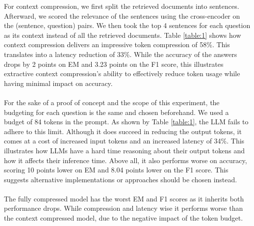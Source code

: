 \documentclass[pdflatex,sn-mathphys-num,oneside]{sn-jnl}%
\theoremstyle{thmstyleone}%
\theoremstyle{thmstyletwo}%
\theoremstyle{thmstylethree}%
\begin{document}
For context compression, we first split the retrieved documents into sentences. 
Afterward, we scored the relevance of the sentences using the cross-encoder on the (sentence, question) pairs.
We then took the top 4 sentences for each question as its context instead of all the retrieved documents. 
Table \ref{table:1} shows how context compression delivers an impressive token compression of 58\%. This translates into a latency reduction of 33\%.
While the accuracy of the answers drops by 2 points on EM and 3.23 points on the F1 score, 
this illustrates extractive context compression's ability to effectively reduce token usage while having minimal impact on accuracy.
\\ \\
For the sake of a proof of concept and the scope of this experiment, the budgeting for each question is the same and chosen beforehand. We used a budget of 84 tokens in the prompt. 
As shown by Table \ref{table:1}, the LLM fails to adhere to this limit. Although it does succeed in reducing the output tokens, it comes at a cost of increased input tokens and an increased latency of 34\%.
This illustrates how LLMs have a hard time reasoning about their output tokens and how it affects their inference time. 
Above all, it also performs worse on accuracy, scoring 10 points lower on EM and 8.04 points lower on the F1 score. 
This suggests alternative implementations or approaches should be chosen instead.
\\ \\
The fully compressed model has the worst EM and F1 scores as it inherits both performance drops. 
While compression and latency wise it performs worse than the context compressed model, due to the negative impact of the token budget.


\pagebreak


\end{document}
